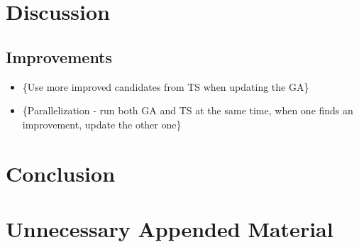 \documentclass[bachelor]{kththesis}
\newcommand{\red}[1]{{\color{red} \{#1\}}}
\begin{document}
\chapter{Discussion}
\section{Improvements}
\begin{itemize}
\item \red{Use more improved candidates from TS when updating the GA}
\item \red{Parallelization - run both GA and TS at the same time, when one finds an improvement, update the other one}
\end{itemize}

\chapter{Conclusion}

\printbibliography[heading=bibintoc] %

\appendix

\chapter{Unnecessary Appended Material}
\end{document}

